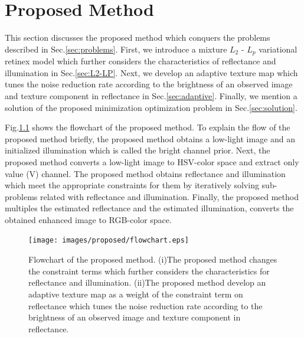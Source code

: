 \chapter{Proposed Method}
\label{sec:proposed}
This section discusses the proposed method which conquers the problems described in Sec.\ref{sec:problems}.
First, we introduce a mixture $L_{2}$ - $L_{p}$ variational retinex model which further considers the characteristics of reflectance and illumination in Sec.\ref{sec:L2-LP}. Next, we develop an adaptive texture map which tunes the noise reduction rate according to the brightness of an observed image and texture component in reflectance in Sec.\ref{sec:adaptive}. 
Finally, we mention a solution of the proposed minimization optimization problem in Sec.\ref{sec:solution}.\par
Fig.\ref{fig:proposed/flowchart} shows the flowchart of the proposed method. To explain the flow of the proposed method briefly, the proposed method obtains a low-light image and an initialized illumination which is called the bright channel prior. Next, the proposed method converts a low-light image to HSV-color space and extract only value (V) channel. The proposed method obtains reflectance and illumination which meet the appropriate constraints for them by iteratively solving sub-problems related with reflectance and illumination. Finally, the proposed method multiples the estimated reflectance and the estimated illumination, converts the obtained enhanced image to RGB-color space.
\begin{figure}[tb]
	\centering
	\texttt{[image: images/proposed/flowchart.eps]}
	\caption{Flowchart of the proposed method. (i)The proposed method changes the constraint terms which further considers the characteristics for reflectance and illumination. (ii)The proposed method develop an adaptive texture map as a weight of the constraint term on reflectance which tunes the noise reduction rate according to the brightness of an observed image and texture component in reflectance.} \label{fig:proposed/flowchart}
\end{figure}

